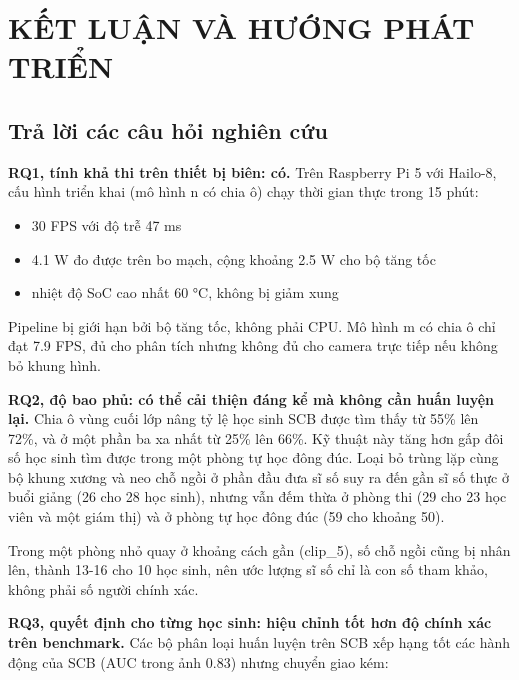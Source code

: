 \chapter{KẾT LUẬN VÀ HƯỚNG PHÁT TRIỂN}

\section{Trả lời các câu hỏi nghiên cứu}

\textbf{RQ1, tính khả thi trên thiết bị biên: có.} Trên Raspberry Pi 5 với Hailo-8, cấu hình triển khai (mô hình n có chia ô) chạy thời gian thực trong 15 phút:

\begin{itemize}
\tightlist
\item
  30 FPS với độ trễ 47 ms
\item
  4.1 W đo được trên bo mạch, cộng khoảng 2.5 W cho bộ tăng tốc
\item
  nhiệt độ SoC cao nhất 60 °C, không bị giảm xung
\end{itemize}

Pipeline bị giới hạn bởi bộ tăng tốc, không phải CPU. Mô hình m có chia ô chỉ đạt 7.9 FPS, đủ cho phân tích nhưng không đủ cho camera trực tiếp nếu không bỏ khung hình.

\textbf{RQ2, độ bao phủ: có thể cải thiện đáng kể mà không cần huấn luyện lại.} Chia ô vùng cuối lớp nâng tỷ lệ học sinh SCB được tìm thấy từ 55\% lên 72\%, và ở một phần ba xa nhất từ 25\% lên 66\%. Kỹ thuật này tăng hơn gấp đôi số học sinh tìm được trong một phòng tự học đông đúc. Loại bỏ trùng lặp cùng bộ khung xương và neo chỗ ngồi ở phần đầu đưa sĩ số suy ra đến gần sĩ số thực ở buổi giảng (26 cho 28 học sinh), nhưng vẫn đếm thừa ở phòng thi (29 cho 23 học viên và một giám thị) và ở phòng tự học đông đúc (59 cho khoảng 50).

Trong một phòng nhỏ quay ở khoảng cách gần (clip\_5), số chỗ ngồi cũng bị nhân lên, thành 13-16 cho 10 học sinh, nên ước lượng sĩ số chỉ là con số tham khảo, không phải số người chính xác.

\textbf{RQ3, quyết định cho từng học sinh: hiệu chỉnh tốt hơn độ chính xác trên benchmark.} Các bộ phân loại huấn luyện trên SCB xếp hạng tốt các hành động của SCB (AUC trong ảnh 0.83) nhưng chuyển giao kém:

